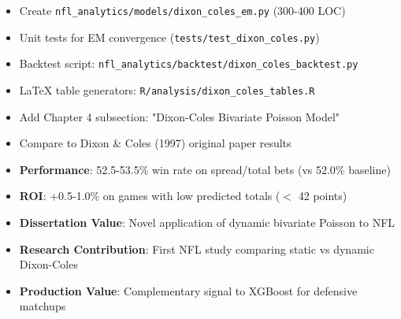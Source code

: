 \begin{itemize}
  \item {} Create \texttt{nfl\_analytics/models/dixon\_coles\_em.py} (300-400 LOC)
  \item {} Unit tests for EM convergence (\texttt{tests/test\_dixon\_coles.py})
  \item {} Backtest script: \texttt{nfl\_analytics/backtest/dixon\_coles\_backtest.py}
  \item {} LaTeX table generators: \texttt{R/analysis/dixon\_coles\_tables.R}
  \item {} Add Chapter 4 subsection: "Dixon-Coles Bivariate Poisson Model"
  \item {} Compare to Dixon \& Coles (1997) original paper results
\end{itemize}

\begin{itemize}
  \item \textbf{Performance}: 52.5-53.5\% win rate on spread/total bets (vs 52.0\% baseline)
  \item \textbf{ROI}: +0.5-1.0\% on games with low predicted totals ($<$ 42 points)
  \item \textbf{Dissertation Value}: Novel application of dynamic bivariate Poisson to NFL
  \item \textbf{Research Contribution}: First NFL study comparing static vs dynamic Dixon-Coles
  \item \textbf{Production Value}: Complementary signal to XGBoost for defensive matchups
\end{itemize}


